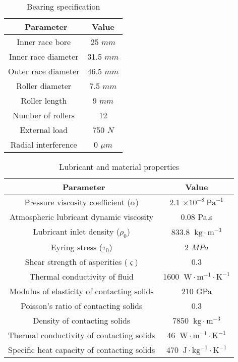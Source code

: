 \begin{table*}
	\caption{Bearing specification}
	\label{Bearing Specification}
	\centering
	\renewcommand{\arraystretch}{1.5}%
	\begin{tabular}{|c|c|}
		\hline
		\ \textbf{Parameter} & \textbf{Value} \\ [0.5ex]
		\hline
		Inner race bore & 25 $mm$ \\ [0.5ex]
		\hline
		Inner race diameter & 31.5 $mm$ \\ [0.5ex]
		\hline
		Outer race diameter & 46.5 $mm$ \\ [0.5ex]
		\hline
		Roller diameter & 7.5 $mm$ \\ [0.5ex]
		\hline
		Roller length & 9 $mm$ \\ [0.5ex]
		\hline
		Number of rollers & 12 \\ [0.5ex]
		\hline
		External load & 750 $N$ \\ [0.5ex]
		\hline
		Radial interference & 0 $\mu m$ \\ [0.5ex]
		\hline
	\end{tabular}
\end{table*}

\begin{table*}
	\caption{Lubricant and material properties}
	\label{Lubricant and Material Properties}
	\centering
	\renewcommand{\arraystretch}{1.5}%
	\begin{tabular}{|c|c|}
		\hline
		\ \textbf{Parameter} & \textbf{Value} \\ [0.5ex]
		\hline
		Pressure viscosity coefficient ($\alpha$) & 2.1 $\times 10^{-8}\mathrm{~Pa}^{-1}$ \\ [0.5ex]
		\hline
		Atmospheric lubricant dynamic viscosity & 0.08 Pa.s \\ [0.5ex]
		\hline
		Lubricant inlet density ($\rho_0$) & 833.8 $\mathrm{~kg}\cdot\mathrm{m}^{-3}$ \\ [0.5ex]
		\hline
		Eyring stress ($\tau_0$) & 2 $MPa$ \\ [0.5ex]
		\hline
		Shear strength of asperities ($\varsigma$) & 0.3 \\ [0.5ex]
		\hline
		Thermal conductivity of fluid & 1600 $\mathrm{~W}\cdot\mathrm{m}^{-1}\cdot\mathrm{K}^{-1}$ \\ [0.5ex]
		\hline
		Modulus of elasticity of contacting solids & 210 GPa \\ [0.5ex]
		\hline
		Poisson’s ratio of contacting solids & 0.3 \\ [0.5ex]
		\hline
        Density of contacting solids & 7850 $\mathrm{~kg}\cdot\mathrm{m}^{-3}$ \\ [0.5ex]
		\hline
		Thermal conductivity of contacting solids & 46 $\mathrm{~W}\cdot\mathrm{m}^{-1}\cdot\mathrm{K}^{-1}$ \\ [0.5ex]
		\hline
		Specific heat capacity of contacting solids & 470 $\mathrm{~J}\cdot\mathrm{kg}^{-1}\cdot\mathrm{K}^{-1}$ \\ [0.5ex]
		\hline
	\end{tabular}
\end{table*}

